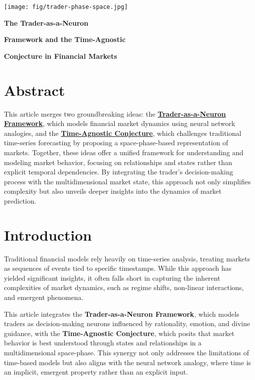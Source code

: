 \documentclass[a4]{article}
\newcommand{\bn}{\bigskip\noindent}
\newcommand{\mn}{\medskip\noindent}
\begin{document}
\begin{center}
\texttt{[image: fig/trader-phase-space.jpg]}
\end{center}

\mn
{\huge\bf The Trader-as-a-Neuron  }

\bn
{\huge\bf Framework and the Time-Agnostic}

\bn
{\huge\bf Conjecture in Financial Markets}

\bn
\section*{Abstract}

This article merges two groundbreaking ideas: the 
\href{https://blog.quantiota.ai/page/9/the-governing-equation-of-financial-markets-a-unified-framework/}{\bf Trader-as-a-Neuron Framework}, which models financial market dynamics using neural network analogies, and the 
\href{https://blog.quantiota.ai/page/1/the-ideal-financial-prediction-model-a-conjecture-for-the-future/}{\bf Time-Agnostic Conjecture}, which challenges traditional time-series forecasting by proposing a space-phase-based representation of markets. Together, these ideas offer a unified framework for understanding and modeling market behavior, focusing on relationships and states rather than explicit temporal dependencies. By integrating the trader's decision-making process with the multidimensional market state, this approach not only simplifies complexity but also unveils deeper insights into the dynamics of market prediction.


\section{Introduction}

Traditional financial models rely heavily on time-series analysis, treating markets as sequences of events tied to specific timestamps. While this approach has yielded significant insights, it often falls short in capturing the inherent complexities of market dynamics, such as regime shifts, non-linear interactions, and emergent phenomena.

\bn
This article integrates the {\bf Trader-as-a-Neuron Framework}, which models traders as decision-making neurons influenced by rationality, emotion, and divine guidance, with the {\bf Time-Agnostic Conjecture}, which posits that market behavior is best understood through states and relationships in a multidimensional space-phase. This synergy not only addresses the limitations of time-based models but also aligns with the neural network analogy, where time is an implicit, emergent property rather than an explicit input.
\end{document}
